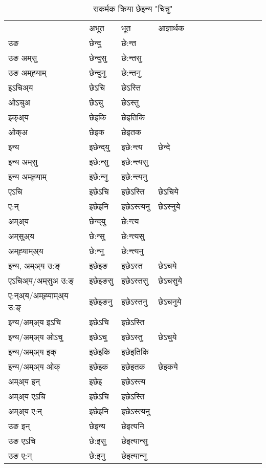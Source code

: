 \begin{table}[H]
\centering
\caption{\label{ent.vt} सकर्मक क्रिया  छेइन्य  "चिन्नु"  }
\begin{tabular}{l|l|l|l|l|l|l|l|l|l|l|l|l}  \toprule
&अभूत & भूत & आज्ञार्थक \\ 
उङ &छेन्दु &छे:न्त \\ 
उङ अम्‌सु&छेन्दुसु &छे:न्तसु \\ 
उङ अम्‌ह्‍याम्&छेन्दुनु &छे:न्तनु \\ 
इऽचिअ्य &छेऽचि &छेऽस्ति   \\ 
ओऽचुअ        &छेऽचु &छेऽस्तु   \\ 
इक्अ्य&छेइकि &छेइतिकि   \\ 
ओक्अ &छेइक &छेइतक   \\ 
इन्य & इछेन्द्‌यु  & इछे:न्त्य &छेन्दे  \\ 
इन्य अम्‌सु& इछे:न्सु  & इछे:न्त्यसु   \\ 
इन्य अम्‌ह्‍याम्& इछे:न्‍नु  & इछे:न्त्यनु   \\ 
एऽचि & इछेऽचि & इछेऽस्ति &छेऽचिये    \\ 
ए:न् & इछेइनि  & इछेऽस्त्यनु &छेऽस्‍नुये  \\ 
अम्अ्य & छेन्द्‌यु  & छे:न्त्य  \\ 
अम्‌सुअ्य & छे:न्सु & छे:न्त्यसु  \\ 
अम्‌ह्‍याम्अ्य & छे:न्‍नु  & छे:न्त्यनु \\ 
\midrule
इन्य, अम्अ्य उ:ङ्‌ &इछेइङ &इछेऽस्त &छेऽचये \\ 
एऽचिअ्य/अम्‌सुअ उ:ङ्‌ &इछेइङसु &इछेऽस्तसु &छेऽचसुये \\ 
ए:न्अ्य/अम्‌ह्‍याम्अ्य उ:ङ्‌ &इछेइङनु &इछेऽस्तनु &छेऽचनुये \\ 
इन्य/अम्अ्य इऽचि &इछेऽचि &इछेऽस्ति    \\ 
इन्य/अम्अ्य ओऽचु &इछेऽचु &इछेऽस्तु  &छेऽचुये  \\ 
इन्य/अम्अ्य इक् &इछेइकि &इछेइतिकि   \\ 
इन्य/अम्अ्य ओक् &इछेइक &इछेइतक  &छेइकये  \\ 
अम्अ्य इन् & इछेइ & इछेऽस्त्य   \\ 
अम्अ्य एऽचि & इछेऽचि & इछेऽस्ति    \\ 
अम्अ्य ए:न् & इछेइनि  & इछेऽस्त्यनु  \\ 
\midrule
उङ इन् & छेइन्य  & छेइत्यनि  \\ 
उङ एऽचि & छे:इसु  & छेइत्यान्सु   \\ 
उङ ए:न्& छे:इनु  & छेइत्यान्‍नु   \\ 
\bottomrule
\end{tabular}
\end{table}


